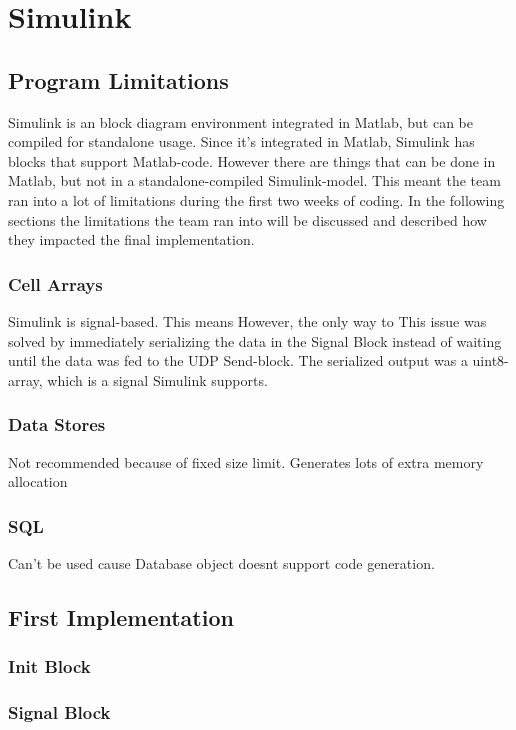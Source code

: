 \section{Simulink}\label{sec:simulink}

\subsection{Program Limitations}\label{sec:simprolim}
Simulink is an block diagram environment integrated in Matlab, but can be compiled for standalone usage. Since it's integrated in Matlab, Simulink has blocks that support Matlab-code. However there are things that can be done in Matlab, but not in a standalone-compiled Simulink-model. This meant the team ran into a lot of limitations during the first two weeks of coding. In the following sections the limitations the team ran into will be discussed and described how they impacted the final implementation.

\subsubsection{Cell Arrays}
Simulink is signal-based. This means 
However, the only way to 
This issue was solved by immediately serializing the data in the Signal Block instead of waiting until the data was fed to the UDP Send-block. The serialized output was a uint8-array, which is a signal Simulink supports.

\subsubsection{Data Stores}
Not recommended because of fixed size limit. Generates lots of extra memory allocation

\subsubsection{SQL}
Can't be used cause Database object doesnt support code generation.

\subsection{First Implementation}\label{sec:simfirim}
\subsubsection{Init Block}
\subsubsection{Signal Block}
